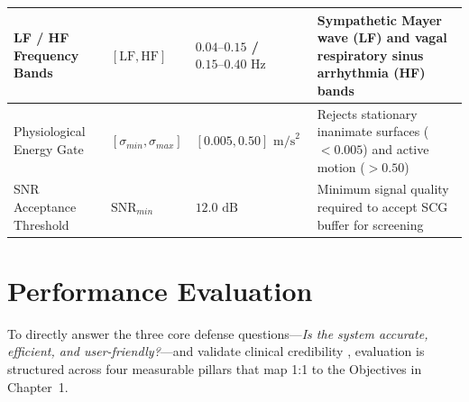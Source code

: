 \begin{table}[!htbp]
\begin{tabular}{|p{2.8cm}|p{1.9cm}|p{2.0cm}|p{5.5cm}|}
		LF / HF Frequency Bands & $[\text{LF}, \text{HF}]$ & $0.04\text{--}0.15$ / $0.15\text{--}0.40\text{ Hz}$ & Sympathetic Mayer wave (LF) and vagal respiratory sinus arrhythmia (HF) bands \\ \hline
		Physiological Energy Gate & $[\sigma_{min}, \sigma_{max}]$ & $[0.005, 0.50]\text{ m/s}^2$ & Rejects stationary inanimate surfaces ($<0.005$) and active motion ($>0.50$) \\ \hline
		SNR Acceptance Threshold & $\text{SNR}_{min}$ & $12.0\text{ dB}$ & Minimum signal quality required to accept SCG buffer for screening \\ \hline
	\end{tabular}
\end{table}

\section{Performance Evaluation}

To directly answer the three core defense questions---\textit{Is the system accurate, efficient, and user-friendly?}---and validate clinical credibility \cite{sokolova2009systematic}, evaluation is structured across four measurable pillars that map 1:1 to the Objectives in Chapter~1.

